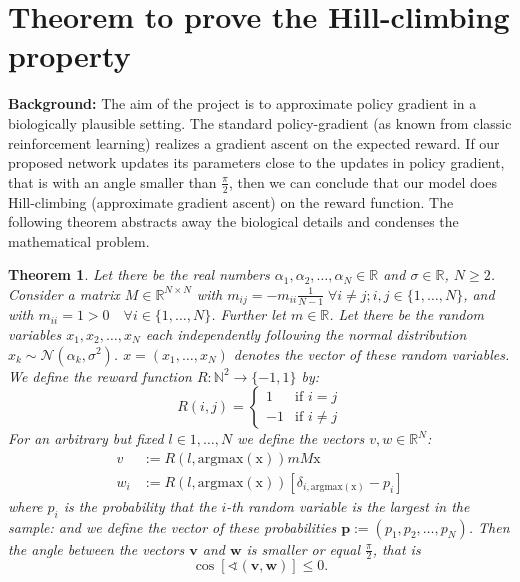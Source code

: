 \documentclass{article}
\newtheorem{theorem}{Theorem}
\theoremstyle{remark}
\begin{document}
\section*{Theorem to prove the Hill-climbing property}

\textbf{Background:} The aim of the project is to approximate policy gradient in a biologically plausible setting.
The standard policy-gradient (as known from classic reinforcement learning) realizes a gradient ascent on the expected reward.
If our proposed network updates its parameters close to the updates in policy gradient, that is with an angle smaller than $\frac{\pi}{2}$, then we can conclude that our model does Hill-climbing (approximate gradient ascent) on the reward function.
The following theorem abstracts away the biological details and condenses the mathematical problem.

\begin{theorem}
Let there be the real numbers $\alpha_1, \alpha_2, \dots ,\alpha_N \in \mathbb{R}$ and $\sigma \in \mathbb{R}$, $N \geq 2$.
Consider a matrix $M \in \mathbb{R}^{N\times N}$ with $m_{ij} = - m_{ii} \frac{1}{N-1} \; \forall i \neq j; i,j \in \{1,\dots,N\}$, and with $m_{ii} = 1 > 0 \quad \forall i \in \{1,\dots,N\}$.
Further let $m \in \mathbb{R}$.
Let there be the random variables $x_1, x_2, \dots , x_N$ each independently following the normal distribution $x_k \sim \mathcal{N}(\alpha_k, \sigma^2)$.
$x = (x_1, \dots, x_N)$ denotes the vector of these random variables.
We define the reward function $R: \mathbb{N}^2 \to \{-1,1\}$ by:
    \begin{equation}
         R(i,j) = 
          \begin{cases} 
           1 & \text{if } i = j\\
           -1       & \text{if } i \neq j
          \end{cases}
    \end{equation}
For an arbitrary but fixed $l \in {1,\dots,N}$ we define the vectors $v,w \in \mathbb{R}^N$:
    \begin{align}
        v &:= R(l, \mathrm{argmax}(\mathrm{x})) m M \mathrm{x}\\
        w_i &:= R(l, \mathrm{argmax}(\mathrm{x})) \left[\delta_{i, \mathrm{argmax}(\mathrm{x})} - p_i \right] 
    \end{align}
where $p_i$ is the probability that the $i$-th random variable is the largest in the sample: and we define the vector of these probabilities $\mathbf{p} := (p_1, p_2, \dots, p_N)$.
Then the angle between the vectors $\mathbf{v}$ and $\mathbf{w}$ is smaller or equal $\frac{\pi}{2}$, that is
    \begin{equation}
        \cos [\sphericalangle(\mathbf{v}, \mathbf{w})] \leq 0.
    \end{equation}
\end{theorem}
\end{document}
